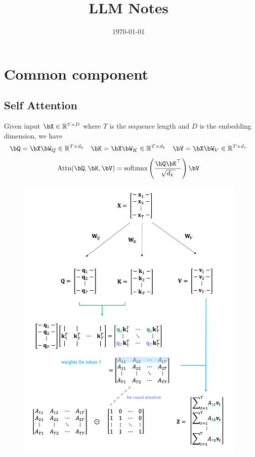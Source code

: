 \documentclass{article}
\begin{document}
\title{LLM Notes}

\date{\today}                       
\maketitle
\tableofcontents
\clearpage


\section{Common component}
\subsection{Self Attention}
Given input $\bX \in \reals^{T \times D}$ where $T$ is the sequence length and $D$ is the embedding dimension, we have
\[
\bQ = \bX \bW_Q \in \reals^{T \times d_k} \quad \bK= \bX \bW_K  \in \reals^{T \times d_k} \quad \bV = \bX \bW_V \in \reals^{T \times d_v}
\]
\[
\text{Attn}(\bQ, \bK, \bV) = \text{softmax} \left(\frac{\bQ \bK^\top}{\sqrt{d_k}} \right) \bV
\]

\begin{figure}[h]
\centering
\includegraphics[scale=0.35]{imgs/self-attention.png}
\end{figure}
\clearpage
\end{document}
